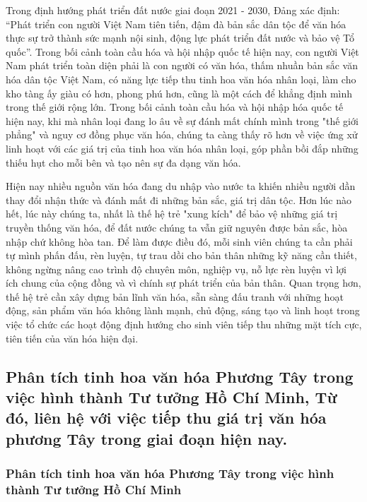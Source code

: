 Trong định hướng phát triển đất nước giai đoạn 2021 - 2030, Đảng xác định: ``Phát triển con người Việt Nam tiên tiến, đậm đà bản sắc dân tộc để văn hóa thực sự trở thành sức mạnh nội sinh, động lực phát triển đất nước và bảo vệ Tổ quốc''. Trong bối cảnh toàn cầu hóa và hội nhập quốc tế hiện nay, con người Việt Nam phát triển toàn diện phải là con người có văn hóa, thấm nhuần bản sắc văn hóa dân tộc Việt Nam, có năng lực tiếp thu tinh hoa văn hóa nhân loại, làm cho kho tàng ấy giàu có hơn, phong phú hơn, cũng là một cách để khẳng định mình trong thế giới rộng lớn. Trong bối cảnh toàn cầu hóa và hội nhập hóa quốc tế hiện nay, khi mà nhân loại đang lo âu về sự đánh mất chính mình trong "thế giới phẳng" và nguy cơ đồng phục văn hóa, chúng ta càng thấy rõ hơn về việc ứng xử linh hoạt với các giá trị của tinh hoa văn hóa nhân loại, góp phần bồi đắp những thiếu hụt cho mỗi bên và tạo nên sự đa dạng văn hóa.

Hiện nay nhiều nguồn văn hóa đang du nhập vào nước ta khiến nhiều người dần thay đổi nhận thức và đánh mất đi những bản sắc, giá trị dân tộc. Hơn lúc nào hết, lúc này chúng ta, nhất là thế hệ trẻ "xung kích" để bảo vệ những giá trị truyền thống văn hóa, để đất nước chúng ta vẫn giữ nguyên được bản sắc, hòa nhập chứ không hòa tan. Để làm được điều đó, mỗi sinh viên chúng ta cần phải tự mình phấn đấu, rèn luyện, tự trau dồi cho bản thân những kỹ năng cần thiết, không ngừng nâng cao trình độ chuyên môn, nghiệp vụ, nỗ lực rèn luyện vì lợi ích chung của cộng đồng và vì chính sự phát triển của bản thân. Quan trọng hơn, thế hệ trẻ cần xây dựng bản lĩnh văn hóa, sẵn sàng đấu tranh với những hoạt động, sản phẩm văn hóa không lành mạnh, chủ động, sáng tạo và linh hoạt trong việc tổ chức các hoạt động định hướng cho sinh viên tiếp thu những mặt tích cực, tiên tiến của văn hóa hiện đại.

\cleardoublepage

\subsection{Phân tích tinh hoa văn hóa Phương Tây trong việc hình thành Tư tưởng Hồ Chí Minh, Từ đó, liên hệ với việc tiếp thu giá trị văn hóa phương Tây trong giai đoạn hiện nay.}

\subsubsection{Phân tích tinh hoa văn hóa Phương Tây trong việc hình thành Tư tưởng Hồ Chí Minh}

